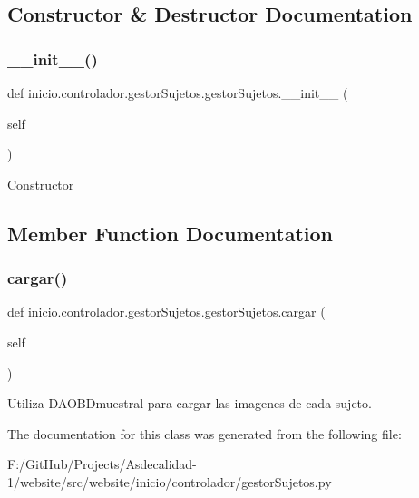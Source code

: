 \subsection{Constructor \& Destructor Documentation}
\mbox{\label{classinicio_1_1controlador_1_1gestor_sujetos_1_1gestor_sujetos_a45b869809ff0f469209290aa691d9de6}} 
\subsubsection{\texorpdfstring{\+\_\+\+\_\+init\+\_\+\+\_\+()}{\_\_init\_\_()}}
{\footnotesize\ttfamily def inicio.\+controlador.\+gestor\+Sujetos.\+gestor\+Sujetos.\+\_\+\+\_\+init\+\_\+\+\_\+ (\begin{DoxyParamCaption}\item[{}]{self }\end{DoxyParamCaption})}

\begin{DoxyVerb}Constructor
\end{DoxyVerb}
 

\subsection{Member Function Documentation}
\mbox{\label{classinicio_1_1controlador_1_1gestor_sujetos_1_1gestor_sujetos_ad513d4a6c28ac01bcbe4a00542f2a6d6}} 
\subsubsection{\texorpdfstring{cargar()}{cargar()}}
{\footnotesize\ttfamily def inicio.\+controlador.\+gestor\+Sujetos.\+gestor\+Sujetos.\+cargar (\begin{DoxyParamCaption}\item[{}]{self }\end{DoxyParamCaption})}

\begin{DoxyVerb}Utiliza DAOBDmuestral para cargar las imagenes de cada sujeto.
\end{DoxyVerb}
 

The documentation for this class was generated from the following file\+:\begin{DoxyCompactItemize}
\item 
F\+:/\+Git\+Hub/\+Projects/\+Asdecalidad-\/1/website/src/website/inicio/controlador/gestor\+Sujetos.\+py\end{DoxyCompactItemize}
